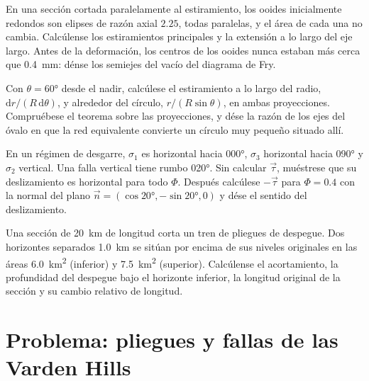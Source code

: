 \begin{exercise}[$\star\star$]\label{exo:b3:structural-analysis:9}
En una sección cortada paralelamente al estiramiento, los ooides inicialmente redondos son
elipses de razón axial $2.25$, todas paralelas, y el área de cada una
no cambia. Calcúlense los estiramientos principales y la extensión a lo largo del eje
largo. Antes de la deformación, los centros de los ooides nunca estaban más cerca que
\qty{0.4}{mm}: dénse los semiejes del vacío del diagrama de Fry.
\end{exercise}

\begin{exercise}[$\star\star\star$]\label{exo:b3:structural-analysis:10}
Con $\theta = \ang{60}$ desde el nadir, calcúlese el estiramiento a lo largo del radio,
$\mathrm dr/(R\,\mathrm d\theta)$, y alrededor del círculo, $r/(R\sin\theta)$,
en ambas proyecciones. Compruébese el teorema sobre las proyecciones, y dése la razón
de los ejes del óvalo en que la red equivalente convierte un círculo muy pequeño
situado allí.
\end{exercise}

\begin{exercise}[$\star\star\star$]\label{exo:b3:structural-analysis:11}
En un régimen de desgarre, $\sigma_1$ es horizontal hacia \ang{000},
$\sigma_3$ horizontal hacia \ang{090} y $\sigma_2$ vertical. Una falla vertical tiene rumbo
\ang{020}. Sin calcular $\vec\tau$, muéstrese que su deslizamiento es horizontal para todo
$\Phi$. Después calcúlese $-\vec\tau$ para $\Phi = 0.4$ con
la normal del plano $\vec n = (\cos\ang{20}, -\sin\ang{20}, 0)$ y dése el
sentido del deslizamiento.
\end{exercise}

\begin{exercise}[$\star\star\star$]\label{exo:b3:structural-analysis:12}
Una sección de \qty{20}{km} de longitud corta un tren de pliegues de despegue. Dos horizontes
separados \qty{1.0}{km} se sitúan por encima de sus niveles originales en las áreas
\qty{6.0}{km^2} (inferior) y \qty{7.5}{km^2} (superior). Calcúlense el acortamiento,
la profundidad del despegue bajo el horizonte inferior, la longitud original de la
sección y su cambio relativo de longitud.
\end{exercise}

\section{Problema: pliegues y fallas de las Varden Hills}

